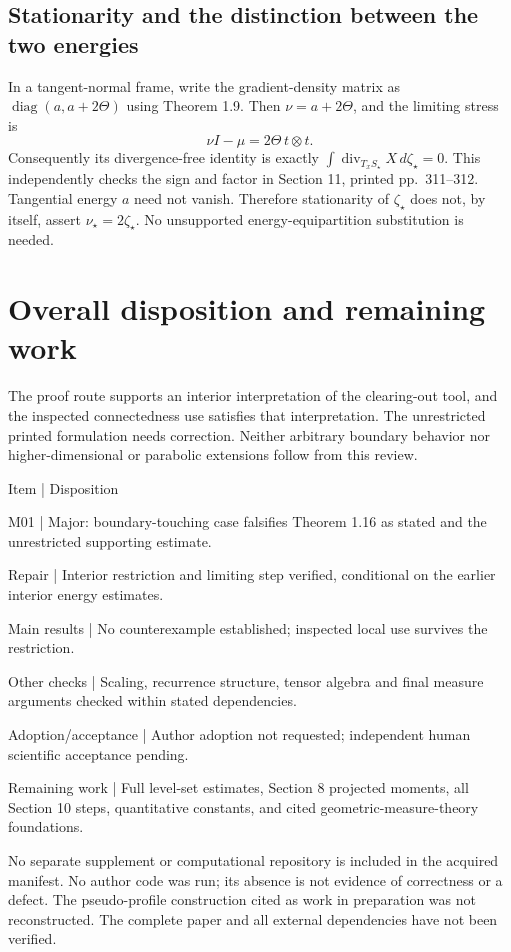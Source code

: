 \documentclass[10pt]{article}
\begin{document}
\subsection*{Stationarity and the distinction between the two energies}
In a tangent-normal frame, write the gradient-density matrix as \(\operatorname{diag}(a,a+2\Theta)\) using Theorem 1.9. Then \(\nu=a+2\Theta\), and the limiting stress is \[\nu I-\mu=2\Theta\,t\otimes t .\] Consequently its divergence-free identity is exactly \(\int \operatorname{div}_{T_xS_\star}X\,d\zeta_\star=0\). This independently checks the sign and factor in Section 11, printed pp. 311–312. Tangential energy \(a\) need not vanish. Therefore stationarity of \(\zeta_\star\) does not, by itself, assert \(\nu_\star=2\zeta_\star\). No unsupported energy-equipartition substitution is needed.\par
\section*{Overall disposition and remaining work}
The proof route supports an interior interpretation of the clearing-out tool, and the inspected connectedness use satisfies that interpretation. The unrestricted printed formulation needs correction. Neither arbitrary boundary behavior nor higher-dimensional or parabolic extensions follow from this review.\par
Item | Disposition\par
M01 | Major: boundary-touching case falsifies Theorem 1.16 as stated and the unrestricted supporting estimate.\par
Repair | Interior restriction and limiting step verified, conditional on the earlier interior energy estimates.\par
Main results | No counterexample established; inspected local use survives the restriction.\par
Other checks | Scaling, recurrence structure, tensor algebra and final measure arguments checked within stated dependencies.\par
Adoption/acceptance | Author adoption not requested; independent human scientific acceptance pending.\par
Remaining work | Full level-set estimates, Section 8 projected moments, all Section 10 steps, quantitative constants, and cited geometric-measure-theory foundations.\par
No separate supplement or computational repository is included in the acquired manifest. No author code was run; its absence is not evidence of correctness or a defect. The pseudo-profile construction cited as work in preparation was not reconstructed. The complete paper and all external dependencies have not been verified.\par
\end{document}
